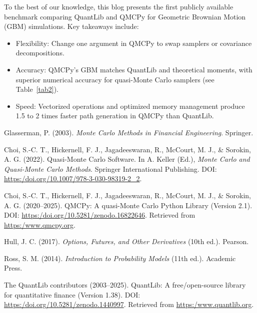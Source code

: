 \bigskip
\begin{tcolorbox}[title=Takeaways,colback=blue!1,colframe=blue!30!black]
To the best of our knowledge, this blog presents the first publicly available benchmark comparing QuantLib and QMCPy for Geometric Brownian Motion (GBM) simulations. Key takeaways include:
\begin{itemize}%
    \item Flexibility: Change one argument in QMCPy to swap samplers or covariance decompositions.
    \item Accuracy: QMCPy's GBM matches QuantLib and theoretical moments, with superior numerical accuracy for quasi-Monte Carlo samplers (see Table~\ref{tab2}).
    \item Speed: Vectorized operations and optimized memory management produce 1.5 to 2 times faster path generation in QMCPy than QuantLib.
\end{itemize}
\end{tcolorbox}


\begin{thebibliography}{6}

Glasserman, P. (2003). \textit{Monte Carlo Methods in Financial Engineering}. Springer.

Choi, S.-C. T., Hickernell, F. J., Jagadeeswaran, R., McCourt, M. J., \& Sorokin, A. G. (2022).
Quasi-Monte Carlo Software. In A. Keller (Ed.), \textit{Monte Carlo and Quasi-Monte Carlo Methods}.
Springer International Publishing. DOI: \url{https:/doi.org/10.1007/978-3-030-98319-2_2}.

Choi, S.-C. T., Hickernell, F. J., Jagadeeswaran, R., McCourt, M. J., \& Sorokin, A. G. (2020--2025).
QMCPy: A quasi-Monte Carlo Python Library (Version 2.1).
DOI: \url{https:/doi.org/10.5281/zenodo.16822646}. 
Retrieved from \url{https:/www.qmcpy.org}.

Hull, J. C. (2017). \textit{Options, Futures, and Other Derivatives} (10th ed.). Pearson.

Ross, S. M. (2014). \textit{Introduction to Probability Models} (11th ed.). Academic Press.

The QuantLib contributors (2003--2025). 
QuantLib: A free/open-source library for quantitative finance (Version 1.38).
DOI: \url{https:/doi.org/10.5281/zenodo.1440997}. 
Retrieved from \url{https:/www.quantlib.org}.
\end{thebibliography}